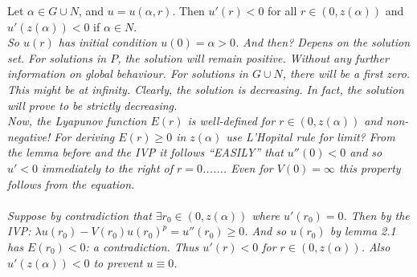 \newpage
\begin{lemma}Let $\alpha\in G\cup N$, and $u=u(\alpha,r)$. Then $u'(r)<0$ for all $r\in(0,z(\alpha))$ and $u'(z(\alpha))<0$ if $\alpha\in N$.\\

\emph{\color{teal}So $u(r)$ has initial condition $u(0)=\alpha>0$. And then? Depens on the solution set. For solutions in $P$, the solution will remain positive. Without any further information on global behaviour. For solutions in $G\cup N$, there will be a first zero. This might be at infinity. Clearly, the solution is decreasing. In fact, the solution will prove to be strictly decreasing.}\\

\emph{\color{red}Now, the Lyapunov function $E(r)$ is well-defined for $r\in(0,z(\alpha))$ and non-negative! For deriving $E(r)\geq0$ in $z(\alpha)$ use L'Hopital rule for limit? From the lemma before and the IVP it follows ``EASILY'' that $u''(0)<0$ and so $u'<0$ immediately to the right of $r=0$....... Even for $V(0)=\infty$ this property follows from the equation.\\ \\ Suppose by contradiction that $\exists r_0\in(0,z(\alpha))$ where $u'(r_0)=0$. Then by the IVP: $\lambda u(r_0) - V(r_0)u(r_0)^p = u''(r_0)\geq 0$. And so $u(r_0)$ by lemma 2.1 has $E(r_0)<0$: a contradiction. Thus $u'(r)<0$ for $r\in(0,z(\alpha))$. Also $u'(z(\alpha))<0$ to prevent $u\equiv0$.}\\


\end{lemma}
